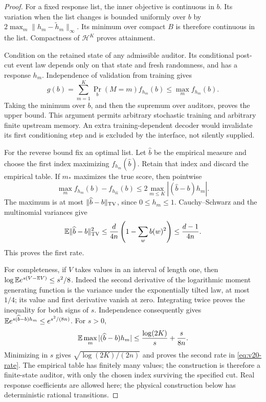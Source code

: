 \begin{proof}
For a fixed response list, the inner objective is continuous in $b$.
Its variation when the list changes is bounded uniformly over $b$ by
$2\max_m\|h_m-\widetilde h_m\|_\infty$. Its minimum over compact $B$
is therefore continuous in the list. Compactness of $\mathcal H^K$
proves attainment.

Condition on the retained state of any admissible auditor. Its conditional
post-cut event law depends only on that state and fresh randomness, and
has a response $h_m$. Independence of validation from training gives
\[
 g(b)=\sum_{m=1}^K \Pr_b(M=m)f_{h_m}(b)
                         \le\max_m f_{h_m}(b).
\]
Taking the minimum over $b$, and then the supremum over auditors, proves
the upper bound. This argument permits arbitrary stochastic training and
arbitrary finite upstream memory. An extra training-dependent decoder
would invalidate its first conditioning step and is excluded by the
interface, not silently supplied.

For the reverse bound fix an optimal list. Let $\widehat b$ be the
empirical measure and choose the first index maximizing
$f_{h_m}(\widehat b)$. Retain that index and discard the empirical table.
If $m_*$ maximizes the true score, then pointwise
\begin{equation}\label{eq:v20-regret}
 \max_m f_{h_m}(b)-f_{h_{\widehat m}}(b)
 \le2\max_{m\le K}|(\widehat b-b)h_m|.
\end{equation}
The maximum is at most $\|\widehat b-b\|_{\rm TV}$, since
$0\le h_m\le1$. Cauchy--Schwarz and the multinomial variances give
\[
 \mathbb E\|\widehat b-b\|_{\rm TV}^2
 \le\frac{d}{4n}\left(1-\sum_w b(w)^2\right)
 \le\frac{d-1}{4n}.
\]
This proves the first rate.

For completeness, if $V$ takes values in an interval of length one, then
$\log\mathbb E e^{s(V-\mathbb E V)}\le s^2/8$. Indeed the second derivative of the
logarithmic moment generating function is the variance under the
exponentially tilted law, at most $1/4$; its value and first derivative
vanish at zero. Integrating twice proves the inequality for both signs
of $s$. Independence consequently gives
$\mathbb E e^{s(\widehat b-b)h_m}\le e^{s^2/(8n)}$. For $s>0$,
\[
 \mathbb E\max_m|(\widehat b-b)h_m|
 \le\frac{\log(2K)}s+\frac{s}{8n}.
\]
Minimizing in $s$ gives $\sqrt{\log(2K)/(2n)}$ and proves the second
rate in \eqref{eq:v20-rate}. The empirical table has finitely many
values; the construction is therefore a finite-state auditor, with only
the chosen index surviving the specified cut. Real response coefficients
are allowed here; the physical construction below has deterministic
rational transitions.


\end{proof}
